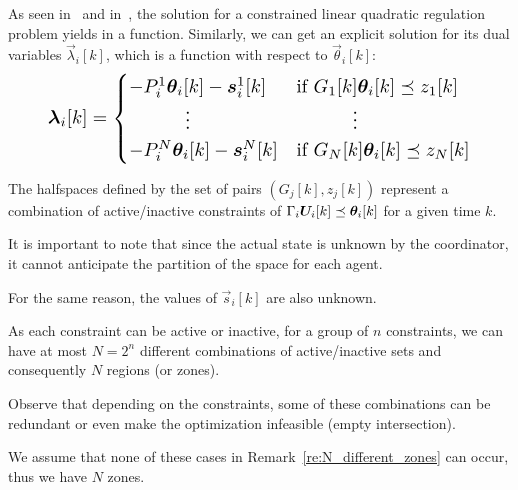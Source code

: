\documentclass{ifacconf}  %
\begin{document}
As seen in~\cite{BemporadEtAl2002} and in~\cite{BorrelliEtAl2017}, the solution for a constrained linear quadratic regulation problem yields in a \pwa{} function.
Similarly, we can get an explicit solution for its dual variables $\vec{\lambda}_{i}[k]$, which is a \pwa{} function with respect to $\vec{\theta}_{i}[k]$:
\begin{equation}
\resizebox{.88\columnwidth}{!}{$
  \begin{aligned}
    \label{eq:lambdafuntheta}
    \lambdaik=
    \begin{cases}
      -P_{i}^{1}\thetaik-\vec{s}_{i}^{1}[k]&\text{if}\ G_{1}[k]\thetaik \preceq z_{1}[k] \\
      \qquad\quad \vdots&\qquad\quad \vdots\\
      -P_{i}^{N}\thetaik-\vec{s}_{i}^{N}[k]&\text{if}\ G_{N}[k]\thetaik \preceq z_{N}[k] \\
    \end{cases}
  \end{aligned}
  $}
\end{equation}

The halfspaces defined by the set of pairs $(G_{j}[k],z_{j}[k])$ represent a combination of active/inactive constraints of ${\bar{\Gamma}_{i}\Uik\preceq\thetaik}$ for a given time $k$.

\begin{challenge}\label{ch:partition_unknown}
  It is important to note that since the actual state is unknown by the coordinator, it cannot anticipate the partition of the space for each agent.
\end{challenge}
\begin{challenge}\label{ch:zone_unknown}
 For the same reason, the values of $\vec{s}_{i}[k]$ are also unknown.
\end{challenge}

 As each constraint can be active or inactive, for a group of $n$ constraints, we can have at most $N=2^{n}$ different combinations of active/inactive sets and consequently $N$ regions (or zones).
 \begin{remark}\label{re:N_different_zones}
  Observe that depending on the constraints, some of these combinations can be redundant or even make the optimization infeasible (empty intersection).
 \end{remark}
 \begin{assumption}
   We assume that none of these cases in Remark~\ref{re:N_different_zones} can occur, thus we have $N$ zones.
 \end{assumption}
\end{document}
